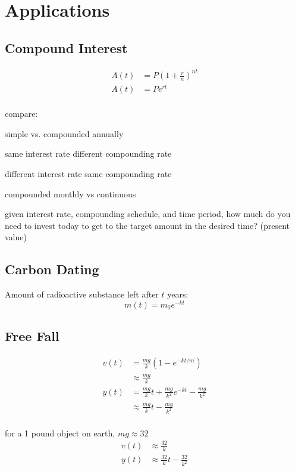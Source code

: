 \documentclass{exam}
\begin{document}
  \section{Applications}

  \subsection{Compound Interest}
  \begin{align*}
    A(t) &= P \left( 1 + \frac{r}{n} \right)^{nt} \\
    A(t) &= P e^{rt} \\
  \end{align*}

  compare:
  \begin{itemize*}
    \item simple vs. compounded annually
    \item same interest rate different compounding rate
    \item different interest rate same compounding rate
    \item compounded monthly vs continuous
    \item given interest rate, compounding schedule, and time period, how much do you need to invest today to get to the
      target amount in the desired time? (present value)
  \end{itemize*}

  \subsection{Carbon Dating}

  Amount of radioactive substance left after $t$ years:
  \[
    m(t) = m_0 e^{-kt}
  \]

  \subsection{Free Fall}

  \begin{align*}
    v(t) &= \frac{mg}{k} \left( 1 - e^{-kt/m} \right) \\
         &\approx \frac{mg}{k} \\
    y(t) &= \frac{mg}{k} t + \frac{mg}{k^2} e^{-kt} - \frac{mg}{k^2} \\
         &\approx \frac{mg}{k} t - \frac{mg}{k^2} \\
  \end{align*}

  for a 1 pound object on earth, $mg \approx 32$
  \begin{align*}
    v(t) &\approx \frac{32}{k} \\
    y(t) &\approx \frac{32}{k} t - \frac{32}{k^2} \\
  \end{align*}
\end{document}
